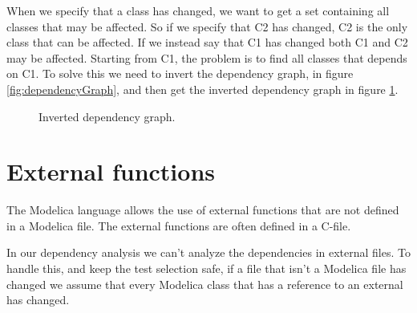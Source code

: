 \documentclass{cslthse-msc}
\begin{document}
When we specify that a class has changed, we want to get a set containing all classes that may be affected. So if we specify that C2 has changed, C2 is the only class that can be affected. If we instead say that C1 has changed both C1 and C2 may be affected. Starting from C1, the problem is to find all classes that depends on C1. To solve this we need to invert the dependency graph, in figure \ref{fig:dependencyGraph}, and then get the inverted dependency graph in figure \ref{fig:invertedGraph}. 
\begin{figure}[H]
    \centering
    \caption{Inverted dependency graph.}
    \label{fig:invertedGraph}
\end{figure}
\section{External functions}
The Modelica language allows the use of external functions that are not defined in a Modelica file. The external functions are often defined in a C-file.\cite{modelicamodelica}

In our dependency analysis we can't analyze the dependencies in external files. To handle this, and keep the test selection safe, if a file that isn't a Modelica file has changed we assume that every Modelica class that has a reference to an external has changed.
\end{document}
